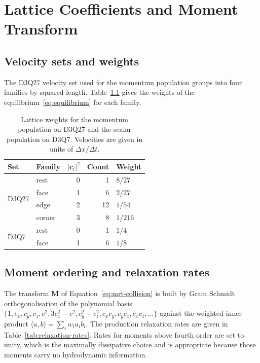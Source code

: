 \chapter{Lattice Coefficients and Moment Transform}
\label{app:coefficients}

\section{Velocity sets and weights}
\label{sec:app-weights}

The D3Q27 velocity set used for the momentum population groups into four
families by squared length. Table~\ref{tab:d3q27-weights} gives the weights of
the equilibrium~\eqref{eq:equilibrium} for each family.

\begin{table}[h]
\centering
\caption[D3Q27 and D3Q7 lattice weights]{Lattice weights for the momentum
population on D3Q27 and the scalar population on D3Q7. Velocities are given in
units of $\Delta x / \Delta t$.}
\label{tab:d3q27-weights}
\begin{tabular}{llrrl}
\toprule
Set & Family & $|\mathbf{c}_i|^{2}$ & Count & Weight \\
\midrule
\multirow{4}{*}{D3Q27}
 & rest      & 0 & 1  & $8/27$ \\
 & face      & 1 & 6  & $2/27$ \\
 & edge      & 2 & 12 & $1/54$ \\
 & corner    & 3 & 8  & $1/216$ \\
\midrule
\multirow{2}{*}{D3Q7}
 & rest      & 0 & 1  & $1/4$ \\
 & face      & 1 & 6  & $1/8$ \\
\bottomrule
\end{tabular}
\end{table}

\section{Moment ordering and relaxation rates}
\label{sec:app-moments}

The transform $\mathbf{M}$ of Equation~\eqref{eq:mrt-collision} is built by
Gram Schmidt orthogonalisation of the polynomial basis
$\{1, c_x, c_y, c_z, c^{2}, 3c_x^{2}-c^{2}, c_y^{2}-c_z^{2}, c_x c_y, c_y c_z,
c_x c_z, \dots\}$ against the weighted inner product
$\langle a, b \rangle = \sum_i w_i a_i b_i$. The production relaxation rates
are given in Table~\ref{tab:relaxation-rates}. Rates for moments above fourth
order are set to unity, which is the maximally dissipative choice and is
appropriate because those moments carry no hydrodynamic information.


